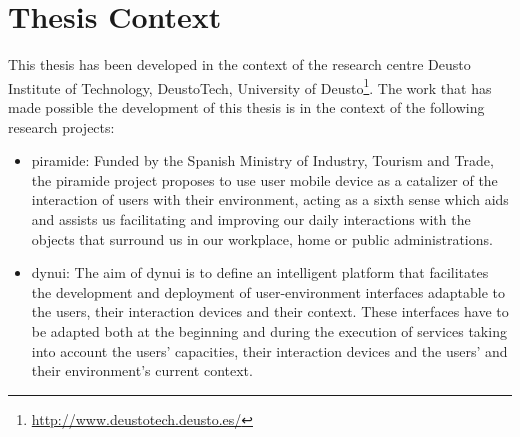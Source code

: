 
\section{Thesis Context}
\label{sec:thesis_context}

This thesis has been developed in the context of the research centre Deusto
Institute of Technology, DeustoTech, University of Deusto\footnote{\url{http://www.deustotech.deusto.es/}}.
The work that has made possible the development of this thesis is in the context 
of the following research projects:

\begin{itemize}
  \item \acs{piramide}: Funded by the Spanish Ministry of Industry, Tourism and 
  Trade, the \ac{piramide} project proposes to use user mobile device as a 
  catalizer of the interaction of users with their environment, acting as a 
  sixth sense which aids and assists us facilitating and improving our daily 
  interactions with the objects that surround us in our workplace, home or 
  public administrations.
  
  
  \item \acs{dynui}: The aim of \ac{dynui} is to define an intelligent 
  platform that facilitates the development and deployment of user-environment 
  interfaces adaptable to the users, their interaction devices and their 
  context. These interfaces have to be adapted both at the beginning and 
  during the execution of services taking into account the users' capacities, 
  their interaction devices and the users' and their environment's current 
  context.
 
\end{itemize}





